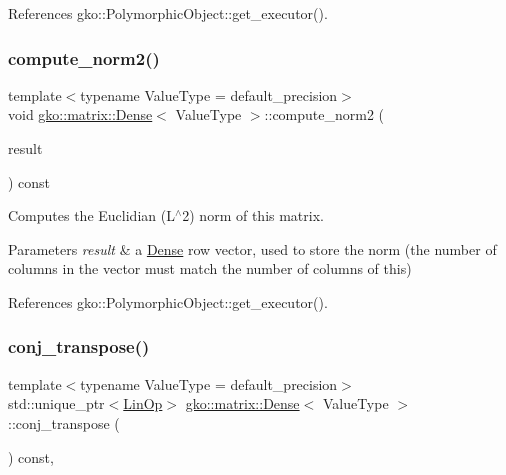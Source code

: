 References gko\+::\+Polymorphic\+Object\+::get\+\_\+executor().

\mbox{\label{classgko_1_1matrix_1_1Dense_a97fd354c4a26814586cd256b5f0d7bea}} 
\subsubsection{\texorpdfstring{compute\+\_\+norm2()}{compute\_norm2()}}
{\footnotesize\ttfamily template$<$typename Value\+Type = default\+\_\+precision$>$ \\
void \hyperlink{classgko_1_1matrix_1_1Dense}{gko\+::matrix\+::\+Dense}$<$ Value\+Type $>$\+::compute\+\_\+norm2 (\begin{DoxyParamCaption}\item[{\hyperlink{classgko_1_1LinOp}{Lin\+Op} $\ast$}]{result }\end{DoxyParamCaption}) const\hspace{0.3cm}{\ttfamily [inline]}}



Computes the Euclidian (L$^\wedge$2) norm of this matrix. 


\begin{DoxyParams}{Parameters}
{\em result} & a \hyperlink{classgko_1_1matrix_1_1Dense}{Dense} row vector, used to store the norm (the number of columns in the vector must match the number of columns of this) \\
\hline
\end{DoxyParams}


References gko\+::\+Polymorphic\+Object\+::get\+\_\+executor().

\mbox{\label{classgko_1_1matrix_1_1Dense_a19890b1448497a50d57c16ed4c3bd820}} 
\subsubsection{\texorpdfstring{conj\+\_\+transpose()}{conj\_transpose()}}
{\footnotesize\ttfamily template$<$typename Value\+Type = default\+\_\+precision$>$ \\
std\+::unique\+\_\+ptr$<$\hyperlink{classgko_1_1LinOp}{Lin\+Op}$>$ \hyperlink{classgko_1_1matrix_1_1Dense}{gko\+::matrix\+::\+Dense}$<$ Value\+Type $>$\+::conj\+\_\+transpose (\begin{DoxyParamCaption}{ }\end{DoxyParamCaption}) const\hspace{0.3cm}{\ttfamily [override]}, {\ttfamily [virtual]}}



